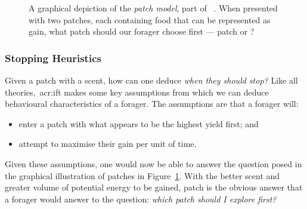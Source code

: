 \begin{figure}[t!]
    \centering
    \caption[The patch model]{A graphical depiction of the \emph{patch model}, part of ~. When presented with two patches, each containing food that can be represented as gain, what patch should our forager choose first — patch  or ?}
    \label{fig:patch_model}
\end{figure}

\subsubsection{Stopping Heuristics}\label{sec:stopping_background:theoretical:ift:stopping}
Given a patch with a scent, how can one deduce \emph{when they should stop?} Like all theories,~\gls{acr:ift} makes some key assumptions from which we can deduce behavioural characteristics of a forager. The assumptions are that a forager will:

\begin{itemize}
    \item{enter a patch with what appears to be the highest yield first; and}
    \item{attempt to maximise their gain per unit of time.}
\end{itemize}

Given these assumptions, one would now be able to answer the question posed in the graphical illustration of patches in Figure~\ref{fig:patch_model}. With the better scent and greater volume of potential energy to be gained, patch  is the obvious answer that a forager would answer to the question: \emph{which patch should I explore first?}

